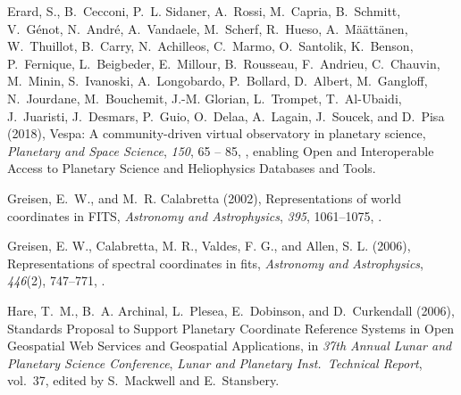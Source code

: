 \begin{thebibliography}{22}
Erard, S., B.~Cecconi, P.~L. Sidaner, A.~Rossi, M.~Capria, B.~Schmitt,
  V.~G\'enot, N.~Andr\'e, A.~Vandaele, M.~Scherf, R.~Hueso,
  A.~M{\"a}{\"a}tt{\"a}nen, W.~Thuillot, B.~Carry, N.~Achilleos, C.~Marmo,
  O.~Santolik, K.~Benson, P.~Fernique, L.~Beigbeder, E.~Millour, B.~Rousseau,
  F.~Andrieu, C.~Chauvin, M.~Minin, S.~Ivanoski, A.~Longobardo, P.~Bollard,
  D.~Albert, M.~Gangloff, N.~Jourdane, M.~Bouchemit, J.-M. Glorian, L.~Trompet,
  T.~Al-Ubaidi, J.~Juaristi, J.~Desmars, P.~Guio, O.~Delaa, A.~Lagain,
  J.~Soucek, and D.~Pisa (2018), Vespa: A community-driven virtual observatory
  in planetary science, \textit{Planetary and Space Science}, \textit{150}, 65
  -- 85, , enabling Open and
  Interoperable Access to Planetary Science and Heliophysics Databases and
  Tools.

{Greisen}, E.~W., and M.~R. {Calabretta} (2002), {Representations of world
  coordinates in FITS}, \textit{Astronomy and Astrophysics}, \textit{395},
  1061--1075, .

{Greisen, E. W.}, {Calabretta, M. R.}, {Valdes, F. G.}, and {Allen, S. L.}
  (2006), Representations of spectral coordinates in fits, \textit{Astronomy
  and Astrophysics}, \textit{446}(2), 747--771,
  .

{Hare}, T.~M., B.~A. {Archinal}, L.~{Plesea}, E.~{Dobinson}, and
  D.~{Curkendall} (2006), {Standards Proposal to Support Planetary Coordinate
  Reference Systems in Open Geospatial Web Services and Geospatial
  Applications}, in \textit{37th Annual Lunar and Planetary Science
  Conference}, \textit{Lunar and Planetary Inst.~Technical Report}, vol.~37,
  edited by S.~{Mackwell} and E.~{Stansbery}.


\end{thebibliography}
